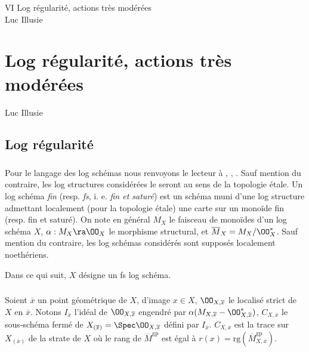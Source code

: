 \documentclass[10pt]{../fichiers-configuration-latex/smfart}
\author{Luc Illusie}
\begin{document}
\begin{center}
VI Log régularité, actions très modérées\\
Luc Illusie
\end{center}

\else
{}
\chapter{Log régularité, actions très modérées}
\begin{center}
Luc Illusie
\end{center}
\fi

\section{Log régularité} \subsection{}\label{6-1.1} Pour le langage des log schémas nous renvoyons
le lecteur à \cite{LSFI@Kato}, \cite{Toric@Niziol}, \cite{HT@GR}. Sauf mention du contraire, les log
structures considérées le seront au sens de la topologie étale. Un log schéma \textit{fin} (resp.
\textit{fs}, i. e. \textit{fin et saturé}) \cite{LSFI@Kato} est un schéma muni d'une log structure
admettant localement (pour la topologie étale) une carte sur un monoïde fin (resp. fin et saturé).
On note en général $M_X$ le faisceau de monoïdes d'un log schéma $X$, $\alpha : M_X \ra
\OO_X$ le morphisme structural, et $\overline{M}_X = M_X/\OO^*_X$. Sauf mention du
contraire, les log schémas considérés sont supposés localement noethériens.

Dans ce qui suit, $X$ désigne un fs log schéma.  \subsection{}\label{6-1.2} Soient $\overline{x}$ un
point géométrique de $X$, d'image $x \in X$, $\OO_{X,\overline{x}}$ le localisé strict de
$X$ en $\overline{x}$. Notons $I_{\overline{x}}$ l'idéal de $\OO_{X,\overline{x}}$ engendré
par $\alpha(M_{X,\overline{x}}-\OO_{X,\overline{x}}^*)$, $C_{X,\overline{x}}$ le sous-schéma
fermé de $X_{(\overline{x})} = \Spec \OO_{X,\overline{x}}$ défini par $I_{\overline{x}}$.
$C_{X,\overline{x}}$ est la trace sur $X_{(\overline{x})}$ de la strate de $X$ où le rang de
$\overline{M}^{\mathrm{gp}}$ est égal à $r(x) =
\mathrm{rg}(\overline{M}_{X,\overline{x}}^{\mathrm{gp}})$. 
\end{document}
